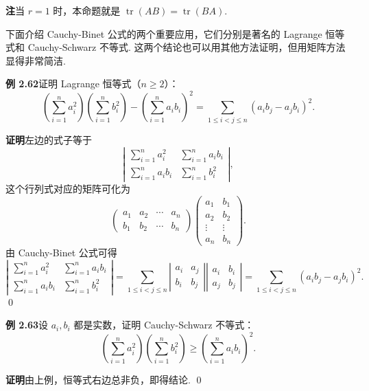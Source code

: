 \documentclass[UTF8,12pt,a4paper,fontset=fandol]{ctexart}
\begin{document}
\noindent\textbf{注}\quad 当 $r=1$ 时，本命题就是 $\operatorname{tr}(AB)=\operatorname{tr}(BA)$.

下面介绍 Cauchy-Binet 公式的两个重要应用，它们分别是著名的 Lagrange 恒等式和 Cauchy-Schwarz 不等式. 这两个结论也可以用其他方法证明，但用矩阵方法显得非常简洁.

\noindent\textbf{例 2.62}\quad 证明 Lagrange 恒等式（$n\ge2$）：
\[
\left(\sum_{i=1}^n a_i^2\right)
\left(\sum_{i=1}^n b_i^2\right)
-\left(\sum_{i=1}^n a_ib_i\right)^2
=\sum_{1\le i<j\le n}(a_ib_j-a_jb_i)^2.
\]

\noindent\textbf{证明}\quad 左边的式子等于
\[
\left|
\begin{array}{cc}
\sum\limits_{i=1}^n a_i^2 & \sum\limits_{i=1}^n a_ib_i\\
\sum\limits_{i=1}^n a_ib_i & \sum\limits_{i=1}^n b_i^2
\end{array}
\right|,
\]
这个行列式对应的矩阵可化为
\[
\left(
\begin{array}{cccc}
a_1 & a_2 & \cdots & a_n\\
b_1 & b_2 & \cdots & b_n
\end{array}
\right)
\left(
\begin{array}{cc}
a_1 & b_1\\
a_2 & b_2\\
\vdots & \vdots\\
a_n & b_n
\end{array}
\right).
\]
由 Cauchy-Binet 公式可得
\[
\left|
\begin{array}{cc}
\sum\limits_{i=1}^n a_i^2 & \sum\limits_{i=1}^n a_ib_i\\
\sum\limits_{i=1}^n a_ib_i & \sum\limits_{i=1}^n b_i^2
\end{array}
\right|
=
\sum_{1\le i<j\le n}
\left|
\begin{array}{cc}
a_i & a_j\\
b_i & b_j
\end{array}
\right|
\left|
\begin{array}{cc}
a_i & b_i\\
a_j & b_j
\end{array}
\right|
=\sum_{1\le i<j\le n}(a_ib_j-a_jb_i)^2.
\]
\qed

\noindent\textbf{例 2.63}\quad 设 $a_i,b_i$ 都是实数，证明 Cauchy-Schwarz 不等式：
\[
\left(\sum_{i=1}^n a_i^2\right)
\left(\sum_{i=1}^n b_i^2\right)
\ge
\left(\sum_{i=1}^n a_ib_i\right)^2.
\]

\noindent\textbf{证明}\quad 由上例，恒等式右边总非负，即得结论. \qed
\end{document}
